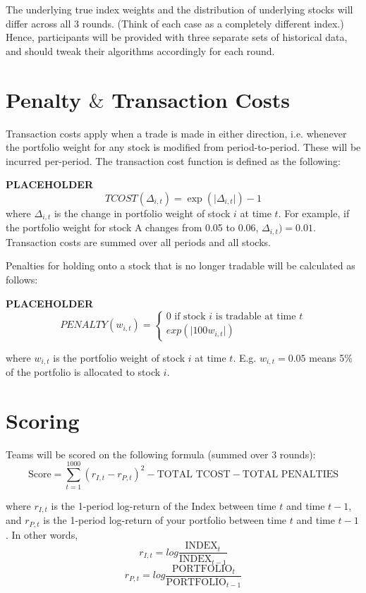 \documentclass{amsart}
\providecommand{\abs}[1]{\lvert #1 \rvert}
\renewcommand{\_}[1]{\underline{ #1 }}
\theoremstyle{definition}
\numberwithin{equation}{subsection}
\begin{document}
The underlying true index weights and the distribution of underlying stocks will differ across all 3 rounds. (Think of each case as a completely different index.) Hence, participants will be provided with three separate sets of historical data, and should tweak their algorithms accordingly for each round.

\section{Penalty $\&$ Transaction Costs}

Transaction costs apply when a trade is made in either direction, i.e. whenever the portfolio weight for any stock is modified from period-to-period. These will be incurred per-period. The transaction cost function is defined as the following:

\textbf{PLACEHOLDER}
$$TCOST(\Delta_{i,t}) = \exp\left(\abs{\Delta_{i,t}}\right) - 1$$
where $\Delta_{i,t}$ is the change in portfolio weight of stock $i$ at time $t$. For example, if the portfolio weight for stock A changes from 0.05 to 0.06, $\Delta_{i,t}) = 0.01$. Transaction costs are summed over all periods and all stocks. 

Penalties for holding onto a stock that is no longer tradable will be calculated as follows:

\textbf{PLACEHOLDER}
$$PENALTY(w_{i,t}) = \begin{cases}
0 \text{ if stock $i$ is tradable at time $t$}\\
exp(\abs{100w_{i,t}})
\end{cases}$$

where $w_{i,t}$ is the portfolio weight of stock $i$ at time $t$. E.g. $w_{i,t} = 0.05$ means 5\% of the portfolio is allocated to stock $i$.

\section{Scoring}
Teams will be scored on the following formula (summed over 3 rounds):
$$\text{Score} = \sum_{t=1}^{1000} (r_{I,t} - r_{P,t})^2 - \text{TOTAL TCOST} - \text{TOTAL PENALTIES}$$

where $r_{I,t}$ is the 1-period log-return of the Index between time $t$ and time $t-1$, and $r_{P,t}$ is the 1-period log-return of your portfolio between time $t$ and time $t-1$. In other words, 
$$r_{I,t} = log\frac{\text{INDEX}_t}{\text{INDEX}_{t-1}}$$
$$r_{P,t} = log\frac{\text{PORTFOLIO}_t}{\text{PORTFOLIO}_{t-1}}$$
\end{document}
